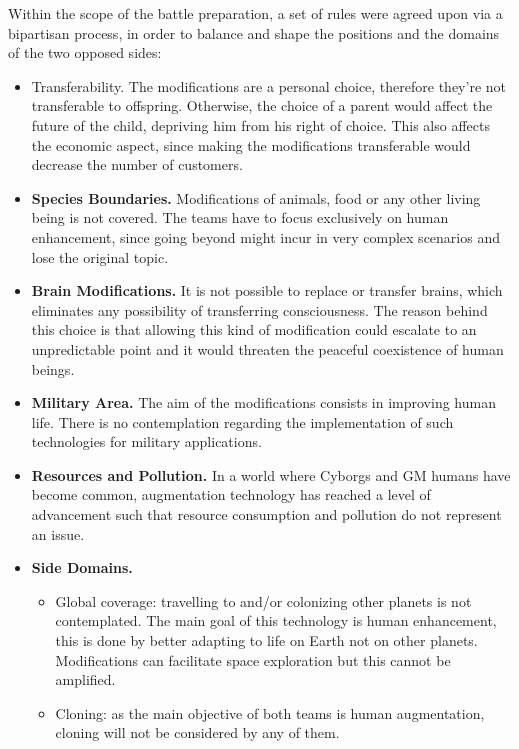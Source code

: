 Within the scope of the battle preparation, a set of rules were agreed upon via a bipartisan process, in order to balance and shape the positions and the domains of the two opposed sides:\\
\begin{itemize}
    \item Transferability. The modifications are a personal choice, therefore they’re not transferable to offspring. Otherwise, the choice of a parent would affect the future of the child, depriving him from his right of choice. This also affects the economic aspect, since making the modifications transferable would decrease the number of customers. 
    \item \textbf{Species Boundaries.} Modifications of animals, food or any other living being is not covered. The teams have to focus exclusively on human enhancement, since going beyond might incur in very complex scenarios and lose the original topic.
    \item \textbf{Brain Modifications.} It is not possible to replace or transfer brains, which eliminates any possibility of transferring consciousness. The reason behind this choice is that allowing this kind of modification could escalate to an unpredictable point and it would threaten the peaceful coexistence of human beings.
    \item \textbf{Military Area.} The aim of the modifications consists in improving human life. There is no contemplation regarding the implementation of such technologies for military applications.
    \item \textbf{Resources and Pollution.} In a world where Cyborgs and GM humans have become common, augmentation technology has reached a level of advancement such that resource consumption and pollution do not represent an issue.
    \item \textbf{Side Domains.}  
        \begin{itemize}
            \item Global coverage: travelling to and/or colonizing other planets is not contemplated. The main goal of this technology is human enhancement, this is done by better adapting to life on Earth not on other planets. Modifications can facilitate space exploration but this cannot be amplified. 
            \item Cloning: as the main objective of both teams is human augmentation, cloning will not be considered by any of them.
        \end{itemize}
\end{itemize}







